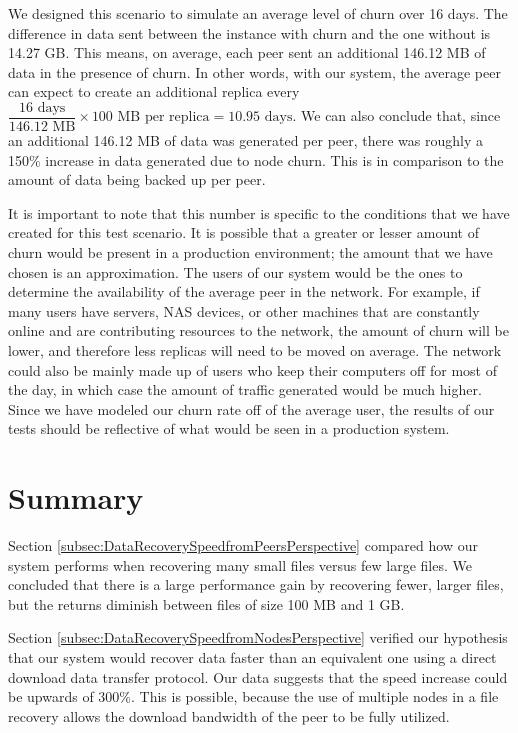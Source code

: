 \documentclass[12pt]{report}
\begin{document}
We designed this scenario to simulate an average level of churn over 16 days. The difference in data sent between the instance with churn and the one without is 14.27 GB. This means, on average, each peer sent an additional 146.12 MB of data in the presence of churn. In other words, with our system, the average peer can expect to create an additional replica every $\dfrac{16 \text{ days}}{146.12 \text{ MB}} \times 100 \text{ MB per replica} = 10.95 \text{ days}$. We can also conclude that, since an additional 146.12 MB of data was generated per peer, there was roughly a 150\% increase in data generated due to node churn. This is in comparison to the amount of data being backed up per peer.

It is important to note that this number is specific to the conditions that we have created for this test scenario. It is possible that a greater or lesser amount of churn would be present in a production environment; the amount that we have chosen is an approximation. The users of our system would be the ones to determine the availability of the average peer in the network. For example, if many users have servers, NAS devices, or other machines that are constantly online and are contributing resources to the network, the amount of churn will be lower, and therefore less replicas will need to be moved on average. The network could also be mainly made up of users who keep their computers off for most of the day, in which case the amount of traffic generated would be much higher. Since we have modeled our churn rate off of the average user, the results of our tests should be reflective of what would be seen in a production system.

\section{Summary}


Section \ref{subsec:DataRecoverySpeedfromPeersPerspective} compared how our system performs when recovering many small files versus few large files. We concluded that there is a large performance gain by recovering fewer, larger files, but the returns diminish between files of size 100 MB and 1 GB.

Section \ref{subsec:DataRecoverySpeedfromNodesPerspective} verified our hypothesis that our system would recover data faster than an equivalent one using a direct download data transfer protocol. Our data suggests that the speed increase could be upwards of 300\%. This is possible, because the use of multiple nodes in a file recovery allows the download bandwidth of the peer to be fully utilized.
\end{document}
